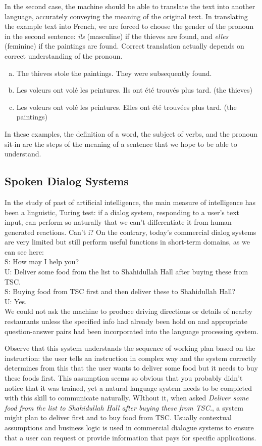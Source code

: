 In the second case, the machine should be able to translate the text into another language, accurately conveying the meaning of the original text. In translating the example text into French, we are forced to choose the gender of the pronoun in the second sentence: \emph{ils} (masculine) if the thieves are found, and \emph{elles} (feminine) if the paintings are found. Correct translation actually depends on correct understanding of the pronoun.
\begin{enumerate}[a.]
    \item The thieves stole the paintings. They were subsequently found.
    \item Les voleurs ont volé les peintures. Ils ont été trouvés plus tard. (the thieves)
    \item Les voleurs ont volé les peintures. Elles ont été trouvées plus tard. (the paintings)
\end{enumerate}
In these examples, the definition of a word, the subject of verbs, and the pronoun sit-in are the steps of the meaning of a sentence that we hope to be able to understand.

\subsection{Spoken Dialog Systems}
In the study of past of artificial intelligence, the main measure of intelligence has been a linguistic, Turing test: if a dialog system, responding to a user's text input, can perform so naturally that we can't differentiate it from human-generated reactions. Can't i? On the contrary, today's commercial dialog systems are very limited but still perform useful functions in short-term domains, as we can see here:\\
S: How may I help you?\\
U: Deliver some food from the list to Shahidullah Hall after buying these from TSC.\\
S: Buying food from TSC first and then deliver these to Shahidullah Hall?\\
U: Yes.\\

We could not ask the machine to produce driving directions or details of nearby restaurants unless the specified info had already been hold on and appropriate question-answer pairs had been incorporated into the language processing system.

Observe that this system understands the sequence of working plan based on the instruction: the user tells an instruction in complex way and the system correctly determines from this that the user wants to deliver some food but it needs to buy these foods first. This assumption seems so obvious that you probably didn't notice that it was trained, yet a natural language system needs to be completed with this skill to communicate naturally. WIthout it, when asked \emph{Deliver some food from the list to Shahidullah Hall after buying these from TSC.}, a system might plan to deliver first and to buy food from TSC.
Usually contextual assumptions and business logic is used in commercial dialogue systems to ensure that a user can request or provide information that pays for specific applications.

